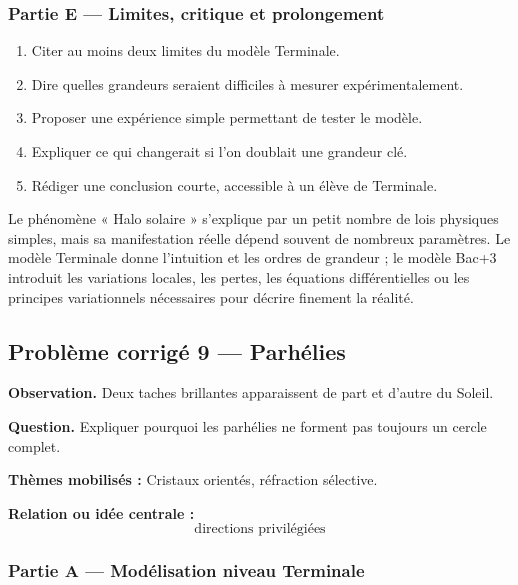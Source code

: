 \documentclass[11pt,a4paper]{article}
\begin{document}
\subsubsection*{Partie E — Limites, critique et prolongement}

\begin{enumerate}
  \item Citer au moins deux limites du modèle Terminale.
  \item Dire quelles grandeurs seraient difficiles à mesurer expérimentalement.
  \item Proposer une expérience simple permettant de tester le modèle.
  \item Expliquer ce qui changerait si l'on doublait une grandeur clé.
  \item Rédiger une conclusion courte, accessible à un élève de Terminale.
\end{enumerate}

\begin{corrigebox}
Le phénomène « Halo solaire » s'explique par un petit nombre de lois physiques simples, mais sa manifestation réelle dépend souvent de nombreux paramètres. Le modèle Terminale donne l'intuition et les ordres de grandeur ; le modèle Bac+3 introduit les variations locales, les pertes, les équations différentielles ou les principes variationnels nécessaires pour décrire finement la réalité.
\end{corrigebox}

\subsection{Problème corrigé 9 — Parhélies}

\begin{exercicebox}
\textbf{Observation.} Deux taches brillantes apparaissent de part et d'autre du Soleil.

\medskip
\textbf{Question.} Expliquer pourquoi les parhélies ne forment pas toujours un cercle complet.

\medskip
\textbf{Thèmes mobilisés :} Cristaux orientés, réfraction sélective.

\medskip
\textbf{Relation ou idée centrale :}
\[
\text{directions privilégiées}
\]
\end{exercicebox}

\subsubsection*{Partie A — Modélisation niveau Terminale}
\end{document}
